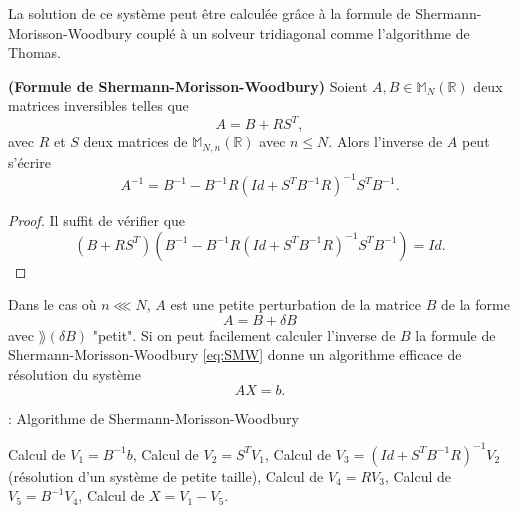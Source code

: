 La solution de ce système peut être calculée grâce à la formule de Shermann-Morisson-Woodbury couplé à un solveur tridiagonal comme l'algorithme de Thomas.

\begin{proposition}
\textbf{(Formule de Shermann-Morisson-Woodbury)} Soient $A, B \in \mathbb{M}_N \left(\mathbb{R} \right)$ deux matrices inversibles telles que 
\begin{equation}
A = B + R S^T,
\end{equation}
avec $R$ et $S$ deux matrices de $\mathbb{M}_{N,n} \left(\mathbb{R} \right)$ avec $n \leq N$.
Alors l'inverse de $A$ peut s'écrire
\begin{equation}
A^{-1} = B^{-1} - B^{-1} R \left( Id + S^T B^{-1} R  \right)^{-1} S^T B^{-1}.
\label{eq:SMW}
\end{equation}
\end{proposition}

\begin{proof}
Il suffit de vérifier que 
\begin{equation}
\left( B + R S^T \right) \left( B^{-1} - B^{-1} R \left( Id + S^T B^{-1} R  \right)^{-1} S^T B^{-1} \right) = Id.
\end{equation}
\end{proof}

Dans le cas où $n \lll N$, $A$ est une petite perturbation de la matrice $B$ de la forme 
\begin{equation}
A = B + \delta B
\end{equation}
avec $\rang  (\delta B) $ "petit". Si on peut facilement calculer l'inverse de $B$ la formule de Shermann-Morisson-Woodbury \eqref{eq:SMW} donne un algorithme efficace de résolution du système
\begin{equation}
A X = b.
\end{equation} 

\begin{center}
\begin{minipage}[H]{12cm}
  \begin{algorithm}[H]
    \caption{: Algorithme de Shermann-Morisson-Woodbury}\label{alg:SMW}
    \begin{algorithmic}[1]
	\State Calcul de $V_1 = B^{-1} b$,
	\State Calcul de $V_2 = S^T V_1$,
	\State Calcul de $V_3 = (Id + S^T B^{-1}R)^{-1} V_2$ (résolution d'un système de petite taille),
	\State Calcul de $V_4 = R V_3$,
	\State Calcul de $V_5 = B^{-1} V_4$,
	\State Calcul de $X = V_1 - V_5$.
    \end{algorithmic}
    \end{algorithm}
\end{minipage}
\end{center}

